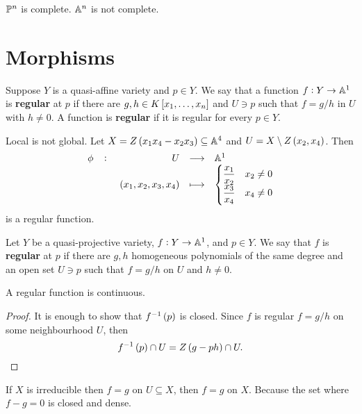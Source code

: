 \begin{example}
$ \P^n $ is complete. $ \A^n $ is not complete.
\end{example}

\pagebreak

\section{Morphisms}

\begin{definition}
Suppose $ Y $ is a quasi-affine variety and $ p \in Y $. We say that a function $ f : Y \to \A^1 $ is \textbf{regular} at $ p $ if there are $ g, h \in K\sbr{x_1, \dots, x_n} $ and $ U \ni p $ such that $ f = g / h $ in $ U $ with $ h \ne 0 $. A function is \textbf{regular} if it is regular for every $ p \in Y $.
\end{definition}

\begin{example}
Local is not global. Let $ X = Z\br{x_1x_4 - x_2x_3} \subseteq \A^4 $ and $ U = X \setminus Z\br{x_2, x_4} $. Then
$$ \function[\phi]{U}{\A^1}{\br{x_1, x_2, x_3, x_4}}{
\begin{cases}
\dfrac{x_1}{x_2} & x_2 \ne 0 \\
\dfrac{x_3}{x_4} & x_4 \ne 0
\end{cases}
} $$
is a regular function.
\end{example}

\begin{definition}
Let $ Y $ be a quasi-projective variety, $ f : Y \to \A^1 $, and $ p \in Y $. We say that $ f $ is \textbf{regular} at $ p $ if there are $ g, h $ homogeneous polynomials of the same degree and an open set $ U \ni p $ such that $ f = g / h $ on $ U $ and $ h \ne 0 $.
\end{definition}

\begin{lemma}
A regular function is continuous.
\end{lemma}

\begin{proof}
It is enough to show that $ f^{-1}\br{p} $ is closed. Since $ f $ is regular $ f = g / h $ on some neighbourhood $ U $, then
$$ f^{-1}\br{p} \cap U = Z\br{g - ph} \cap U. $$
\end{proof}

\begin{remark}
If $ X $ is irreducible then $ f = g $ on $ U \subseteq X $, then $ f = g $ on $ X $. Because the set where $ f - g = 0 $ is closed and dense.
\end{remark}

